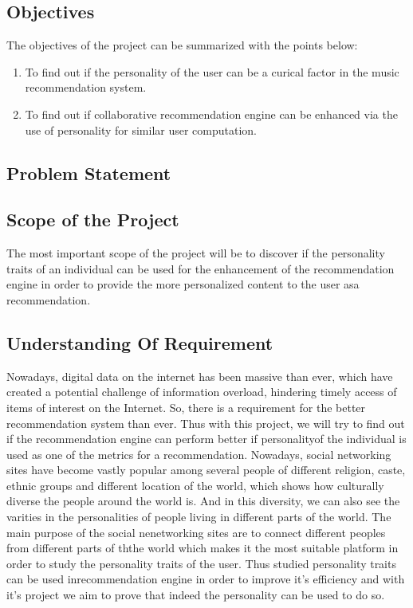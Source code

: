 \subsection{Objectives}
The objectives of the project can be summarized with the points below:
\begin{enumerate}
\item To find out if the personality of the user can be a curical factor in the music recommendation system.
\item To find out if collaborative recommendation engine can be enhanced via the use of personality for similar user computation.
\end{enumerate}

\subsection{Problem Statement}

\subsection{Scope of the Project}
The most important scope of the project will be to discover if the personality traits of an individual can be used for the enhancement of the recommendation engine in order to provide the more personalized content to the user asa recommendation.

\subsection{Understanding Of Requirement}
Nowadays, digital data on the internet has been massive than ever, which have created a potential challenge of information overload, hindering timely access of items of interest on the Internet. So, there is a requirement for the better recommendation system than ever. Thus with this project, we will try to find out if the recommendation engine can perform better if personalityof the individual is used as one of the metrics for a recommendation. Nowadays, social networking sites have become vastly popular among several people of different religion, caste, ethnic groups and different location of the world, which shows how culturally diverse the people around the world is. And in this diversity, we can also see the varities in the personalities of people living in different parts of the world. The main purpose of the social nenetworking sites are to connect different peoples from different parts of ththe world which makes it the most suitable platform in order to study the personality traits of the user. Thus studied personality traits can be used inrecommendation engine in order to improve it's efficiency and with it's project we aim to prove that indeed the personality can be used to do so.

